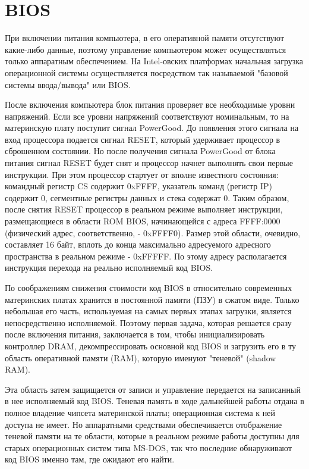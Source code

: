 \newpage
\section{BIOS}

При включении питания компьютера, в его оперативной памяти отсутствуют какие-либо данные, поэтому управление компьютером может осуществляться только аппаратным обеспечением. На Intel-овских платформах начальная загрузка операционной системы осуществляется посредством так называемой "базовой системы ввода/вывода" или BIOS.

После включения компьютера блок питания проверяет все необходимые уровни напряжений. Если все уровни напряжений соответствуют номинальным, то на материнскую плату поступит сигнал PowerGood. До появления этого сигнала на вход процессора подается сигнал RESET, который удерживает процессор в сброшенном состоянии. Но после получения сигнала PowerGood от блока питания сигнал RESET будет снят и процессор начнет выполнять свои первые инструкции. При этом процессор стартует от вполне известного состояния: командный регистр CS содержит 0xFFFF, указатель команд (регистр IP) содержит 0, сегментные регистры данных и стека содержат 0. Таким образом, после снятия RESET процессор в реальном режиме выполняет инструкции, размещающиеся в области ROM BIOS, начинающейся с адреса FFFF:0000 (физический адрес, соответственно, - 0xFFFF0). Размер этой области, очевидно, составляет 16 байт, вплоть до конца максимально адресуемого адресного пространства в реальном режиме - 0xFFFFF. По этому адресу располагается инструкция перехода на реально исполняемый код BIOS.

По соображениям снижения стоимости код BIOS в относительно современных материнских платах хранится в постоянной памяти (ПЗУ) в сжатом виде. Только небольшая его часть, используемая на самых первых этапах загрузки, является непосредственно исполняемой. Поэтому первая задача, которая решается сразу после включения питания, заключается в том, чтобы инициализировать контроллер DRAM, декомпрессировать основной код BIOS и загрузить его в ту область оперативной памяти (RAM), которую именуют "теневой" (shadow RAM).

Эта область затем защищается от записи и управление передается на записанный в нее исполняемый код BIOS. Теневая память в ходе дальнейшей работы отдана в полное владение чипсета материнской платы; операционная система к ней доступа не имеет. Но аппаратными средствами обеспечивается отображение теневой памяти на те области, которые в реальном режиме работы доступны для старых операционных систем типа MS-DOS, так что последние обнаруживают код BIOS именно там, где ожидают его найти.

